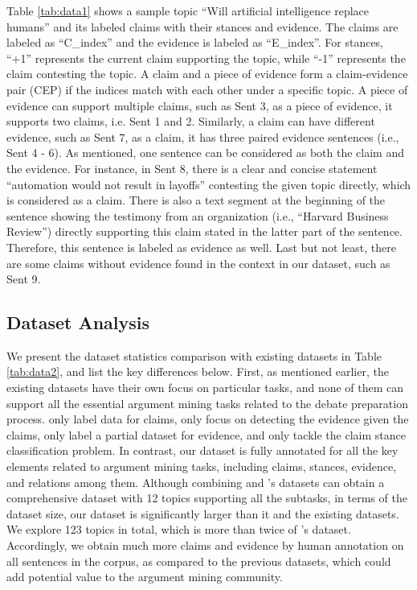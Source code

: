 \documentclass[11pt]{article}
\begin{document}
Table \ref{tab:data1} shows a sample topic ``Will artificial intelligence replace humans'' and its labeled claims with their stances and evidence.
The claims are labeled as ``C\_index'' and the evidence is labeled as ``E\_index''.
For stances, ``+1'' represents the current claim supporting the topic, while ``-1'' represents the claim contesting the topic.
A claim and a piece of evidence form a claim-evidence pair (CEP) if the indices match with each other under a specific topic.
A piece of evidence can support multiple claims, such as Sent 3, as a piece of evidence, it supports two claims, i.e. Sent 1 and 2.
Similarly, a claim can have different evidence, such as Sent 7, as a claim, it has three paired evidence sentences (i.e., Sent 4 - 6).
As mentioned, one sentence can be considered as both the claim and the evidence.
For instance, in Sent 8, there is a clear and concise statement ``automation would not result in layoffs'' contesting the given topic directly, which is considered as a claim.
There is also a text segment at the beginning of the sentence showing the testimony from an organization (i.e., ``Harvard Business Review'') directly supporting this claim stated in the latter part of the sentence. Therefore, this sentence is labeled as evidence as well.
Last but not least, there are some claims without evidence found in the context in our dataset, such as Sent 9.





\subsection{Dataset Analysis}
\label{sec:data_analysis}

We present the dataset statistics comparison with existing datasets in Table \ref{tab:data2}, and list the key differences below.
First, as mentioned earlier, the existing datasets have their own focus on particular tasks, and none of them can support all the essential argument mining tasks related to the debate preparation process.
\citet{levy2014context} only label data for claims, \citet{rinott2015show} only focus on detecting the evidence given the claims, \citet{aharoni2014benchmark} only label a partial dataset for evidence, and \citet{bar2017stance} only tackle the claim stance classification problem.
In contrast, our dataset is fully annotated for all the key elements related to argument mining tasks, including claims, stances, evidence, and relations among them.
Although combining \citet{aharoni2014benchmark} and \citet{bar2017stance}'s datasets can obtain a comprehensive dataset with 12 topics supporting all the subtasks,
in terms of the dataset size, our dataset is significantly larger than it and the existing datasets.
We explore 123 topics in total, which is more than twice of \citet{bar2017stance}'s dataset.
Accordingly, we obtain much more claims and evidence by human annotation on all sentences in the corpus, as compared to the previous datasets, which could add potential value to the argument mining community.
\end{document}
